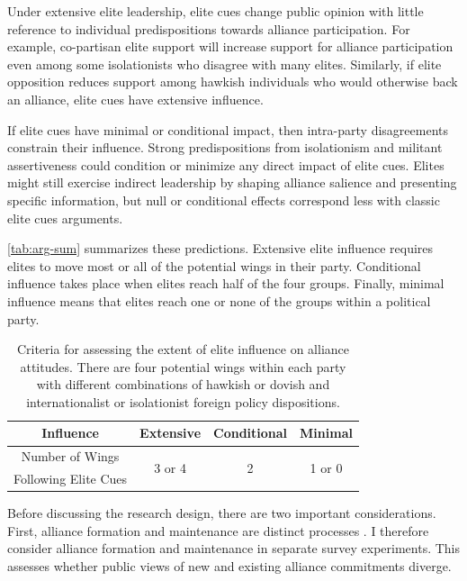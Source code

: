 \documentclass[12pt]{article}
\begin{document}
Under extensive elite leadership, elite cues change public opinion with little reference to individual predispositions towards alliance participation. 
For example, co-partisan elite support will increase support for alliance participation even among some isolationists who disagree with many elites. 
Similarly, if elite opposition reduces support among hawkish individuals who would otherwise back an alliance, elite cues have extensive influence. 


If elite cues have minimal or conditional impact, then intra-party disagreements constrain their influence.
Strong predispositions from isolationism and militant assertiveness could condition or minimize any direct impact of elite cues.
Elites might still exercise indirect leadership by shaping alliance salience and presenting specific information, but null or conditional effects correspond less with classic elite cues arguments. 


\autoref{tab:arg-sum} summarizes these predictions. 
Extensive elite influence requires elites to move most or all of the potential wings in their party. 
Conditional influence takes place when elites reach half of the four groups. 
Finally, minimal influence means that elites reach one or none of the groups within a political party.


\begin{table}[hbt!]
\begin{center}
\begin{tabular}{| c | c | c | c |}
\hline
   Influence          & Extensive & Conditional & Minimal  \\
\hline
   Number of Wings   & \multirow{2}{*}{3 or 4}  & \multirow{2}{*}{2}  & \multirow{2}{*}{1 or 0} \\
   Following Elite Cues     &           &             &  \\
\hline
\end{tabular}
\caption{Criteria for assessing the extent of elite influence on alliance attitudes. There are four potential wings within each party with different combinations of hawkish or dovish and internationalist or isolationist foreign policy dispositions.}
\label{tab:arg-sum}
\end{center} 
\end{table}



Before discussing the research design, there are two important considerations. 
First, alliance formation and maintenance are distinct processes \citep{Snyder1997}. 
I therefore consider alliance formation and maintenance in separate survey experiments.
This assesses whether public views of new and existing alliance commitments diverge. 
\end{document}
